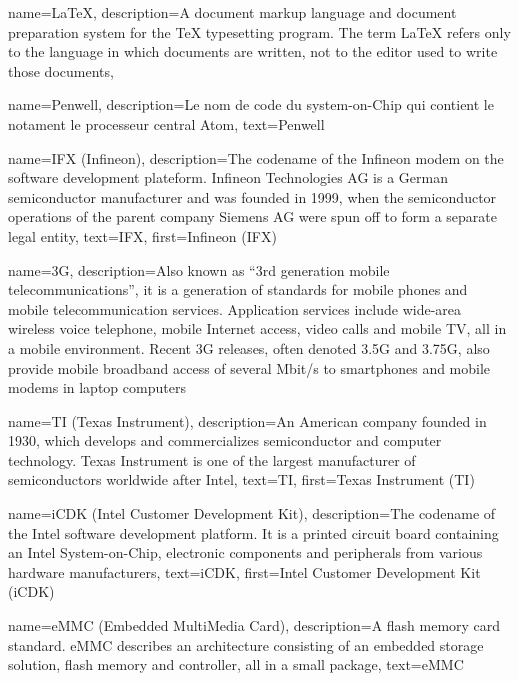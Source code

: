 {
  name=\LaTeX,
  description={A document markup language and document preparation
    system for the TeX typesetting program. The term LaTeX refers only
    to the language in which documents are written, not to the editor
    used to write those documents},
}

{
  name=Penwell,
  description={Le nom de code du system-on-Chip qui contient le notament le processeur
   central Atom},
  text=Penwell
}

{
  name=IFX (Infineon),
  description={The codename of the Infineon modem on the software
    development plateform. Infineon Technologies AG is a German
    semiconductor manufacturer and was founded in 1999, when the
    semiconductor operations of the parent company Siemens AG were
    spun off to form a separate legal entity},
  text=IFX,
  first=Infineon (IFX)
}

{
  name=3G,
  description={Also known as ``3rd generation mobile
    telecommunications'', it is a generation of standards for mobile
    phones and mobile telecommunication services. Application services
    include wide-area wireless voice telephone, mobile Internet
    access, video calls and mobile TV, all in a mobile
    environment. Recent 3G releases, often denoted 3.5G and 3.75G,
    also provide mobile broadband access of several Mbit/s to
    smartphones and mobile modems in laptop computers}
}

{
  name=TI (Texas Instrument),
  description={An American company founded in 1930, which develops and
    commercializes semiconductor and computer technology. Texas
    Instrument is one of the largest manufacturer of semiconductors
    worldwide after Intel},
  text=TI,
  first=Texas Instrument (TI)
}

{
  name=iCDK (Intel Customer Development Kit),
  description={The codename of the Intel software development
    platform. It is a printed circuit board containing an Intel
    System-on-Chip, electronic components and peripherals from various
    hardware manufacturers},
  text=iCDK,
  first=Intel Customer Development Kit (iCDK)
}

{
  name=eMMC (Embedded MultiMedia Card),
  description={A flash memory card standard. eMMC describes an
    architecture consisting of an embedded storage solution, flash
    memory and controller, all in a small package},
  text=eMMC
}

